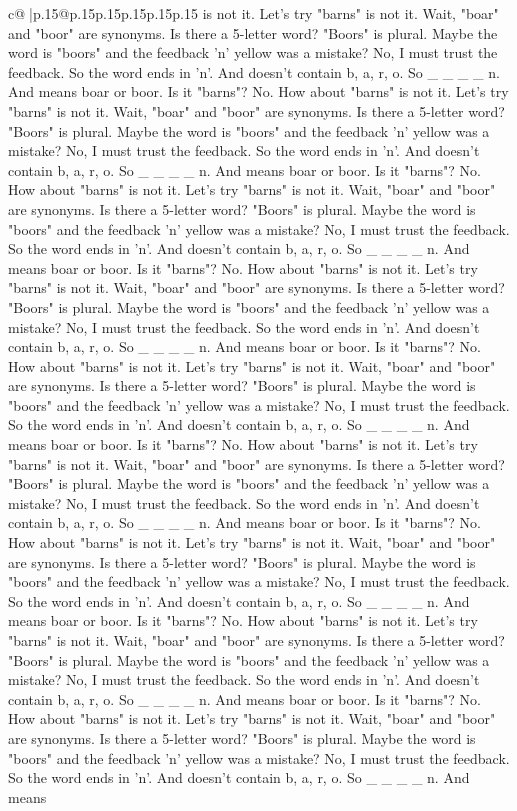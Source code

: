 \documentclass{article}
\begin{document}
{\begin{supertabular}{c@{$\;$}|p{.15\linewidth}@{}p{.15\linewidth}p{.15\linewidth}p{.15\linewidth}p{.15\linewidth}p{.15\linewidth}}
{{{is not it. Let's try "barns" is not it. Wait, "boar" and "boor" are synonyms. Is there a 5{-}letter word? "Boors" is plural. Maybe the word is "boors" and the feedback 'n' yellow was a mistake? No, I must trust the feedback. So the word ends in 'n'. And doesn't contain b, a, r, o. So \_ \_ \_ \_ n. And means boar or boor. Is it "barns"? No. How about "barns" is not it. Let's try "barns" is not it. Wait, "boar" and "boor" are synonyms. Is there a 5{-}letter word? "Boors" is plural. Maybe the word is "boors" and the feedback 'n' yellow was a mistake? No, I must trust the feedback. So the word ends in 'n'. And doesn't contain b, a, r, o. So \_ \_ \_ \_ n. And means boar or boor. Is it "barns"? No. How about "barns" is not it. Let's try "barns" is not it. Wait, "boar" and "boor" are synonyms. Is there a 5{-}letter word? "Boors" is plural. Maybe the word is "boors" and the feedback 'n' yellow was a mistake? No, I must trust the feedback. So the word ends in 'n'. And doesn't contain b, a, r, o. So \_ \_ \_ \_ n. And means boar or boor. Is it "barns"? No. How about "barns" is not it. Let's try "barns" is not it. Wait, "boar" and "boor" are synonyms. Is there a 5{-}letter word? "Boors" is plural. Maybe the word is "boors" and the feedback 'n' yellow was a mistake? No, I must trust the feedback. So the word ends in 'n'. And doesn't contain b, a, r, o. So \_ \_ \_ \_ n. And means boar or boor. Is it "barns"? No. How about "barns" is not it. Let's try "barns" is not it. Wait, "boar" and "boor" are synonyms. Is there a 5{-}letter word? "Boors" is plural. Maybe the word is "boors" and the feedback 'n' yellow was a mistake? No, I must trust the feedback. So the word ends in 'n'. And doesn't contain b, a, r, o. So \_ \_ \_ \_ n. And means boar or boor. Is it "barns"? No. How about "barns" is not it. Let's try "barns" is not it. Wait, "boar" and "boor" are synonyms. Is there a 5{-}letter word? "Boors" is plural. Maybe the word is "boors" and the feedback 'n' yellow was a mistake? No, I must trust the feedback. So the word ends in 'n'. And doesn't contain b, a, r, o. So \_ \_ \_ \_ n. And means boar or boor. Is it "barns"? No. How about "barns" is not it. Let's try "barns" is not it. Wait, "boar" and "boor" are synonyms. Is there a 5{-}letter word? "Boors" is plural. Maybe the word is "boors" and the feedback 'n' yellow was a mistake? No, I must trust the feedback. So the word ends in 'n'. And doesn't contain b, a, r, o. So \_ \_ \_ \_ n. And means boar or boor. Is it "barns"? No. How about "barns" is not it. Let's try "barns" is not it. Wait, "boar" and "boor" are synonyms. Is there a 5{-}letter word? "Boors" is plural. Maybe the word is "boors" and the feedback 'n' yellow was a mistake? No, I must trust the feedback. So the word ends in 'n'. And doesn't contain b, a, r, o. So \_ \_ \_ \_ n. And means boar or boor. Is it "barns"? No. How about "barns" is not it. Let's try "barns" is not it. Wait, "boar" and "boor" are synonyms. Is there a 5{-}letter word? "Boors" is plural. Maybe the word is "boors" and the feedback 'n' yellow was a mistake? No, I must trust the feedback. So the word ends in 'n'. And doesn't contain b, a, r, o. So \_ \_ \_ \_ n. And means }}}
\end{supertabular}}
\end{document}
